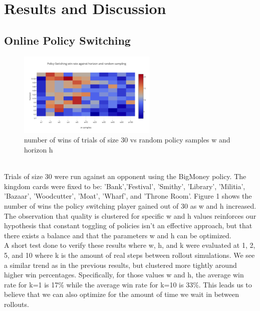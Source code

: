 \documentclass{article}
\begin{document}
\section{Results and Discussion}
\subsection{Online Policy Switching}
\begin{figure}[h]
  \includegraphics[width=250]{switch.png}
  \caption{number of wins of trials of size 30 vs random policy samples w and horizon h}
\end{figure}
\\
Trials of size 30 were run against an opponent using the BigMoney policy. The kingdom cards were fixed to be: 'Bank','Festival', 'Smithy', 'Library', 'Militia', 'Bazaar', 'Woodcutter', 'Moat', 'Wharf', and 'Throne Room'. Figure 1 shows the number of wins the policy switching player gained out of 30 as w and h increased. The observation that quality is clustered for specific w and h values reinforces our hypothesis that constant toggling of policies isn’t an effective approach, but that there exists a balance and that the parameters w and h can be optimized.
\\
A short test done to verify these results where w, h, and k were evaluated at 1, 2, 5, and 10 where k is the amount of real steps between rollout simulations. We see a similar trend as in the previous results, but clustered more tightly around higher win percentages. Specifically, for those values w and h, the average win rate for k=1 is 17\% while the average win rate for k=10 is 33\%. This leads us to believe that we can also optimize for the amount of time we wait in between rollouts.
\\
\end{document}
